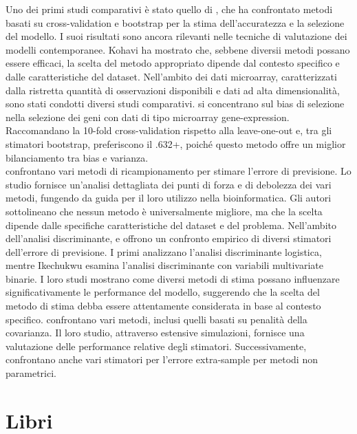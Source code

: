 Uno dei primi studi comparativi è stato quello di \textcite{Kohavi}, che ha confrontato metodi basati su cross-validation e bootstrap per la stima dell’accuratezza e la selezione del modello. I suoi risultati sono ancora rilevanti nelle tecniche di valutazione dei modelli contemporanee. Kohavi ha mostrato che, sebbene diversii metodi possano essere efficaci, la scelta del metodo appropriato dipende dal contesto specifico e dalle caratteristiche del dataset. Nell’ambito dei dati microarray, caratterizzati dalla ristretta quantità di osservazioni disponibili e dati ad alta dimensionalità, sono stati condotti diversi studi comparativi. \textcite{mclachlan} si concentrano sul bias di selezione nella selezione dei geni con dati di tipo microarray gene-expression. Raccomandano la 10-fold cross-validation rispetto alla leave-one-out e, tra gli stimatori bootstrap, preferiscono il .632+, poiché questo metodo offre un miglior bilanciamento tra bias e varianza.\\
\textcite{molinaro2005} confrontano vari metodi di ricampionamento per stimare l’errore di previsione. Lo studio fornisce un’analisi dettagliata dei punti di forza e di debolezza dei vari metodi, fungendo da guida per il loro utilizzo nella bioinformatica. Gli autori sottolineano che nessun metodo è universalmente migliore, ma che la scelta dipende dalle specifiche caratteristiche del dataset e del problema. Nell’ambito dell’analisi discriminante, \textcite{empirical} e \textcite{Ikechukwu} offrono un confronto empirico di diversi stimatori dell’errore di previsione. I primi analizzano l’analisi discriminante logistica, mentre Ikechukwu esamina l’analisi discriminante con variabili multivariate binarie. I loro studi mostrano come diversi metodi di stima possano influenzare significativamente le performance del modello, suggerendo che la scelta del metodo di stima debba essere attentamente considerata in base al contesto specifico. \textcite{techrep} confrontano vari metodi, inclusi quelli basati su penalità della covarianza. Il loro studio, attraverso estensive simulazioni, fornisce una valutazione delle performance relative degli stimatori. Successivamente, \textcite{diciaccio} confrontano anche vari stimatori per l’errore extra-sample per metodi non parametrici. 


\section{Libri}
\label{sec:sezione7.6}


